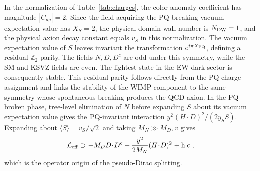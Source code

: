 \documentclass[aps,prd,reprint,preprintnumbers,superscriptaddress,nofootinbib,floatfix]{revtex4-2}
\begin{document}
In the normalization of Table~\ref{tab:charges}, the color anomaly coefficient has magnitude $|C_{ag}|=2$. Since the field acquiring the PQ-breaking vacuum expectation value has $X_S=2$, the physical domain-wall number is $N_{\rm DW}=1$, and the physical axion decay constant equals $v_S$ in this normalization. The vacuum expectation value of $S$ leaves invariant the transformation $e^{i\pi X_{\rm PQ}}$, defining a residual $\mathbb Z_2$ parity. The fields $N,D,D^c$ are odd under this symmetry, while the SM and KSVZ fields are even. The lightest state in the EW dark sector is consequently stable. This residual parity follows directly from the PQ charge assignment and links the stability of the WIMP component to the same symmetry whose spontaneous breaking produces the QCD axion. In the PQ-broken phase, tree-level elimination of $N$ before expanding $S$ about its vacuum expectation value gives the PQ-invariant interaction $y^2(H\!\cdot\!D)^2/(2y_SS)$. Expanding about $\langle S\rangle=v_S/\sqrt{2}$ and taking $M_N\gg M_D,v$ gives~\cite{Nagata:2014wma, Dedes:2016odh}
\begin{equation}
    \mathcal L_{\rm eff}\supset -M_DD\!\cdot\!D^c + \frac{y^2}{2M_N}(H\!\cdot\!D)^2 +\mathrm{h.c.},
    \label{eq:Leff}
\end{equation}
which is the operator origin of the pseudo-Dirac splitting.
\end{document}
